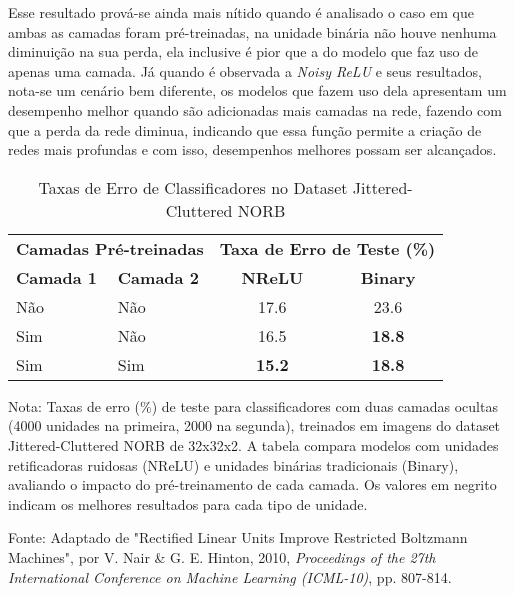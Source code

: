Esse resultado prová-se ainda mais nítido quando é analisado o caso em que ambas as camadas foram pré-treinadas, na unidade binária não houve nenhuma diminuição na sua perda, ela inclusive é pior que a do modelo que faz uso de apenas uma camada. Já quando é observada a \textit{Noisy ReLU} e seus resultados, nota-se um cenário bem diferente, os modelos que fazem uso dela apresentam um desempenho melhor quando são adicionadas mais camadas na rede, fazendo com que a perda da rede diminua, indicando que essa função permite a criação de redes mais profundas e com isso, desempenhos melhores possam ser alcançados.

\begin{table}[ht]
    \centering
    \begin{threeparttable}
        \caption{Taxas de Erro de Classificadores no Dataset Jittered-Cluttered NORB}
        \label{tab:nrelu-norb-comparativo}
        \begin{tabular}{llcc}
            \toprule
            \multicolumn{2}{c}{\textbf{Camadas Pré-treinadas}} & \multicolumn{2}{c}{\textbf{Taxa de Erro de Teste (\%)}} \\
            \cmidrule(r){1-2} \cmidrule(r){3-4} %
            \textbf{Camada 1} & \textbf{Camada 2} & \textbf{NReLU} & \textbf{Binary} \\
            \midrule
            
            Não & Não & 17.6 & 23.6 \\
            Sim & Não & 16.5 & \textbf{18.8} \\
            Sim & Sim & \textbf{15.2} & \textbf{18.8} \\
            
            \bottomrule
        \end{tabular}
        
        \begin{tablenotes}[para]
            \small
            \item[] Nota: Taxas de erro (\%) de teste para classificadores com duas camadas ocultas (4000 unidades na primeira, 2000 na segunda), treinados em imagens do dataset Jittered-Cluttered NORB de 32x32x2. A tabela compara modelos com unidades retificadoras ruidosas (NReLU) e unidades binárias tradicionais (Binary), avaliando o impacto do pré-treinamento de cada camada. Os valores em negrito indicam os melhores resultados para cada tipo de unidade.
            \item[] Fonte: Adaptado de "Rectified Linear Units Improve Restricted Boltzmann Machines", por V. Nair \& G. E. Hinton, 2010, \textit{Proceedings of the 27th International Conference on Machine Learning (ICML-10)}, pp. 807-814.
        \end{tablenotes}
        
    \end{threeparttable}
\end{table}

